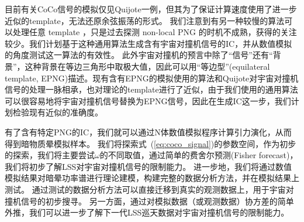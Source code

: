 目前有关CoCo信号的模拟仅见Quijote一例\cite{goldstein2024quijotecc}，但其为了保证计算速度使用了进一步近似的template，无法还原余弦振荡的形式。
我们注意到有另一种较慢的算法可以处理任意 template \cite{wagner2010pshmf,regan2012uningic}，只是过去探测 non-local PNG 的时机不成熟，获得的关注较少。我们计划基于这种通用算法生成含有宇宙对撞机信号的IC，并从数值模拟的角度测试这一算法的有效性。
此外宇宙对撞机的预言中除了“信号”还有“背景”\cite{arkani-hamed2015coco}，这种背景在等边三角形中取极大值，因此可以用“等边型”(equilateral template, EPNG)描述。现有含有EPNG的模拟使用的算法和Quijote对宇宙对撞机信号的处理一脉相承，也对理论的template进行了近似\cite{scoccimarro2012nonlocalpng}，由于我们使用的通用算法可以很容易地将宇宙对撞机信号替换为EPNG信号，因此在生成IC这一步，我们计划检验现有近似的准确度。

有了含有特定PNG的IC，我们就可以通过N体数值模拟程序计算引力演化，从而得到暗物质晕模拟样本。
我们将探索式~(\ref{eq:coco_signal})的参数空间，作为初步的探索，我们将主要尝试$\omega$的不同取值，通过简单的费舍尔预测(Fisher forecast)，我们将初步了解LSS对宇宙对撞机信号的限制能力。
进一步地，我们将通过数值模拟结果对暗晕功率谱进行理论建模，构建完整的数据分析方法，并在模拟结果上测试。
通过测试的数据分析方法可以直接迁移到真实的观测数据上，用于宇宙对撞机信号的初步搜寻。
另一方面，通过对模拟数据（或观测数据）协方差的简单外推，我们可以进一步了解下一代LSS巡天数据对宇宙对撞机信号的限制能力。

